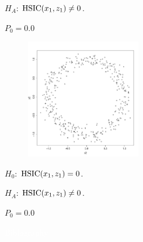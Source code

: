 $H_A$: $\operatorname*{HSIC}(x_1, z_1)\ne0$.

$P_0 = 0.0$
\clearpage
\begin{figure}
  \begin{center}
    \includegraphics[width=5cm]{x2_vs_y2.pdf}
  \end{center}
\end{figure}
$H_0$: $\operatorname*{HSIC}(x_1, z_1)=0$.

$H_A$: $\operatorname*{HSIC}(x_1, z_1)\ne0$.

$P_0 = 0.0$
\clearpage

\textcolor{white}{ %
Biblography
}


\ifoot{}%
\clearpage
%

 